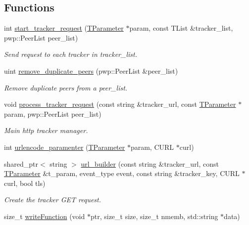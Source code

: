 \subsection*{Functions}
\begin{DoxyCompactItemize}
\item 
int \hyperlink{namespacetracker_afbc30ba2b5f62968e92fedaaa8eab454}{start\+\_\+tracker\+\_\+request} (\hyperlink{structtracker_1_1TParameter}{T\+Parameter} $\ast$param, const T\+List \&tracker\+\_\+list, pwp\+::\+Peer\+List peer\+\_\+list)
\begin{DoxyCompactList}\small\item\em Send request to each tracker in tracker\+\_\+list. \end{DoxyCompactList}\item 
uint \hyperlink{namespacetracker_ab1ce1ce0570dd4742e06b6941f63dbe4}{remove\+\_\+duplicate\+\_\+peers} (pwp\+::\+Peer\+List \&peer\+\_\+list)
\begin{DoxyCompactList}\small\item\em Remove duplicate peers from a peer\+\_\+list. \end{DoxyCompactList}\item 
void \hyperlink{namespacetracker_ab13f3471f16db9505c2853f4e1bde3aa}{process\+\_\+tracker\+\_\+request} (const string \&tracker\+\_\+url, const \hyperlink{structtracker_1_1TParameter}{T\+Parameter} $\ast$param, pwp\+::\+Peer\+List peer\+\_\+list)
\begin{DoxyCompactList}\small\item\em Main http tracker manager. \end{DoxyCompactList}\item 
int \hyperlink{namespacetracker_a0158d3629445e060aef8608eefff5f09}{urlencode\+\_\+paramenter} (\hyperlink{structtracker_1_1TParameter}{T\+Parameter} $\ast$param, C\+U\+RL $\ast$curl)
\item 
shared\+\_\+ptr$<$ string $>$ \hyperlink{namespacetracker_a60c22f265981fba0a5dad14d6d3d516a}{url\+\_\+builder} (const string \&tracker\+\_\+url, const \hyperlink{structtracker_1_1TParameter}{T\+Parameter} \&t\+\_\+param, event\+\_\+type event, const string \&tracker\+\_\+key, C\+U\+RL $\ast$curl, bool tls)
\begin{DoxyCompactList}\small\item\em Create the tracker G\+ET request. \end{DoxyCompactList}\item 
size\+\_\+t \hyperlink{namespacetracker_a6486613c238a5415481c5ae6234aa91b}{write\+Function} (void $\ast$ptr, size\+\_\+t size, size\+\_\+t nmemb, std\+::string $\ast$data)

\end{DoxyCompactItemize}
